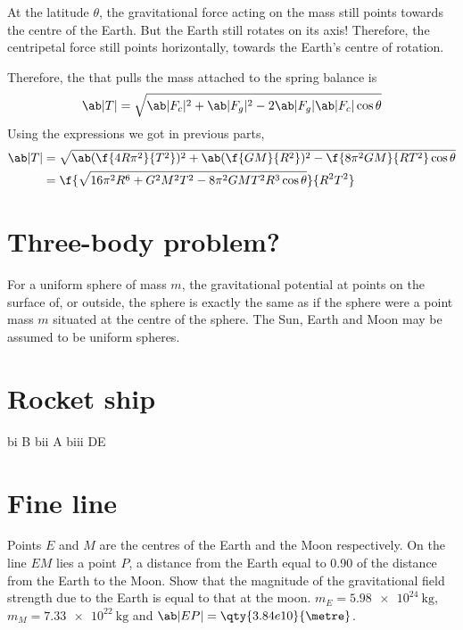 At the latitude \(\theta\), the gravitational force acting on the mass still points towards
the centre of the Earth. But the Earth still rotates on its axis! Therefore, the centripetal force
still points horizontally, towards the Earth's centre of rotation.

Therefore, the  that pulls the mass attached to the spring balance is
\begin{equation*}
	\ab|T| = \sqrt{\ab|F_c|^2 + \ab|F_g|^2 - 2 \ab|F_g|\ab|F_c|\cos\theta}
\end{equation*}
Using the expressions we got in previous parts,
\begin{align*}
	\ab|T| & = \sqrt{\ab(\f{4R\pi^2}{T^2})^2 + \ab(\f{GM}{R^2})^2 - \f{8\pi^2GM}{RT^2}\cos\theta} \\
	       & = \f{\sqrt{16\pi^2 R^6 + G^2M^2T^2 - 8\pi^2GMT^2R^3\cos\theta}}{R^2T^2}
\end{align*}


\section{Three-body problem?}
\begin{problem}
For a uniform sphere of mass \(m\), the gravitational potential at points on the surface of, or outside, the sphere is exactly the same as if the sphere were a point mass \(m\) situated at the centre of the sphere. The Sun, Earth and Moon may be assumed to be uniform spheres.
\end{problem}

\section{Rocket ship}
bi B bii A biii DE

\section{Fine line}
\begin{problem}
Points \(E\) and \(M\) are the centres of the Earth and the Moon respectively.
On the line \(EM\) lies a point \(P\), a distance from the Earth equal to \num{0.90} of the
distance from the Earth to the Moon.
Show that the magnitude of the gravitational field strength due to the Earth is equal to
that at the moon. \(m_E = \qty{5.98e24}{\kilogram}\), \(m_M = \qty{7.33e22}{\kilogram}\) and \(\ab|EP| = \qty{3.84e10}{\metre}\).
\end{problem}

